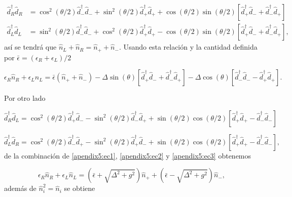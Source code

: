 \begin{appendixs}
\begin{align*}
    \hat{d}^{\dagger}_{R}\hat{d}_{R} & = \cos^{2}(\theta/2) \hat{d}^{\dagger}_{-}\hat{d}_{-} + \sin^{2}(\theta/2) \hat{d}^{\dagger}_{+}\hat{d}_{+} + \cos(\theta/2)\sin(\theta/2)[\hat{d}^{\dagger}_{+}\hat{d}_{-} + \hat{d}^{\dagger}_{-}\hat{d}_{+} ] \\
    \hat{d}^{\dagger}_{L}\hat{d}_{L} & = \sin^{2}(\theta/2) \hat{d}^{\dagger}_{-}\hat{d}_{-} + \cos^{2}(\theta/2) \hat{d}^{\dagger}_{+}\hat{d}_{+} - \cos(\theta/2)\sin(\theta/2)[\hat{d}^{\dagger}_{+}\hat{d}_{-} + \hat{d}^{\dagger}_{-}\hat{d}_{+} ],
\end{align*}
así se tendrá que $\hat{n}_{L} + \hat{n}_{R} = \hat{n}_{+} + \hat{n}_{-}$. Usando esta relación y la cantidad definida por $\bar{\epsilon} = (\epsilon_{R} + \epsilon_{L})/2$ 

\begin{equation}
    \epsilon_{R} \hat{n}_{R} + \epsilon_{L} \hat{n}_{L}  = \bar{\epsilon}( \hat{n}_{+} + \hat{n}_{-} ) - \Delta \sin(\theta) [\hat{d}^{\dagger}_{+}\hat{d}_{-} + \hat{d}^{\dagger}_{-}\hat{d}_{+}] - \Delta \cos(\theta) [\hat{d}^{\dagger}_{-}\hat{d}_{-} - \hat{d}^{\dagger}_{+}\hat{d}_{+}].
\label{apendix5:ec1}
\end{equation}

Por otro lado 

\begin{equation}
    \hat{d}^{\dagger}_{R}\hat{d}_{L} = \cos^{2}(\theta/2)\hat{d}^{\dagger}_{+}\hat{d}_{-} - \sin^{2}(\theta/2) \hat{d}^{\dagger}_{-}\hat{d}_{+}  + \sin(\theta/2)\cos(\theta/2)[ \hat{d}^{\dagger}_{+}\hat{d}_{+} - \hat{d}^{\dagger}_{-}\hat{d}_{-} ]
    \label{apendix5:ec2}
\end{equation}

\begin{equation}
    \hat{d}^{\dagger}_{L}\hat{d}_{R} = \cos^{2}(\theta/2)\hat{d}^{\dagger}_{-}\hat{d}_{+} - \sin^{2}(\theta/2) \hat{d}^{\dagger}_{+}\hat{d}_{-}  + \sin(\theta/2)\cos(\theta/2)[ \hat{d}^{\dagger}_{+}\hat{d}_{+} - \hat{d}^{\dagger}_{-}\hat{d}_{-} ],
    \label{apendix5:ec3}
\end{equation}
de la combinación de \ref{apendix5:ec1}, \ref{apendix5:ec2} y \ref{apendix5:ec3} obtenemos

\begin{equation*}
    \epsilon_{R} \hat{n}_{R} + \epsilon_{L} \hat{n}_{L} = (\bar{\epsilon} + \sqrt{\Delta^{2} + g^{2}})\hat{n}_{+} +  (\bar{\epsilon} - \sqrt{\Delta^{2} + g^{2}})\hat{n}_{-},
\end{equation*}
además de $\hat{n}^{2}_{i} = \hat{n}_{i}$ se obtiene 


\end{appendixs}
